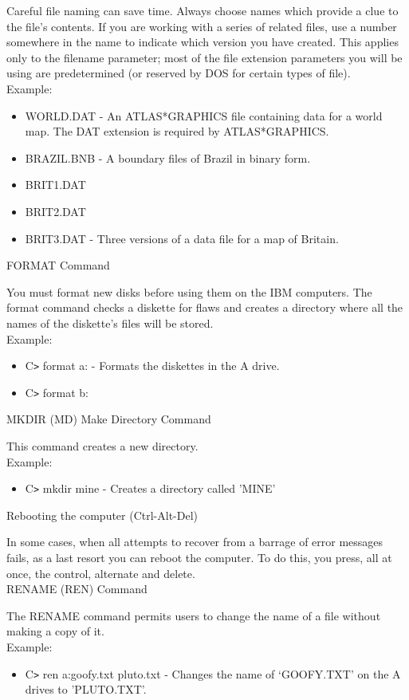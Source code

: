 \documentclass[11pt,a4paper,twoside]{article}
\begin{document}
Careful file naming can save time. Always choose names which provide a clue to the file's contents. If you are working with a series of related files, use a number somewhere in the name to indicate which version you have created. This applies only to the filename parameter; most of the file extension parameters you will be using are predetermined (or reserved by DOS for certain types of file).\\
Example:
\begin{itemize}
    \item WORLD.DAT - An ATLAS*GRAPHICS file containing data for a world map. The DAT extension is required by ATLAS*GRAPHICS.
\item BRAZIL.BNB - A boundary files of Brazil in binary form.
\item BRIT1.DAT
\item BRIT2.DAT
\item BRIT3.DAT - Three versions of a data file for a map of Britain.
\end{itemize}
FORMAT Command\par
You must format new disks before using them on the IBM computers. The format command checks a diskette for flaws and creates a directory where all the names of the diskette's files will be stored.\\
Example:
\begin{itemize}
    \item C\verb=>= format a: - Formats the diskettes in the A drive.
\item C\verb=>= format b: 
\end{itemize}
MKDIR (MD) Make Directory Command\par
This command creates a new directory.\\
Example:
\begin{itemize}
    \item C\verb=>= mkdir mine - Creates a directory called 'MINE'
\end{itemize}
Rebooting the computer (Ctrl-Alt-Del)\par
In some cases, when all attempts to recover from a barrage of error messages fails, as a last resort you can reboot the computer. To do this, you press, all at once, the control, alternate and delete.\\
RENAME (REN) Command\par
The RENAME command permits users to change the name of a file without making a copy of it.\\
Example:
\begin{itemize}
    \item C\verb=>= ren a:goofy.txt pluto.txt - Changes the name of ‘GOOFY.TXT’ on the A drives to 'PLUTO.TXT'.
\end{itemize}
\end{document}
